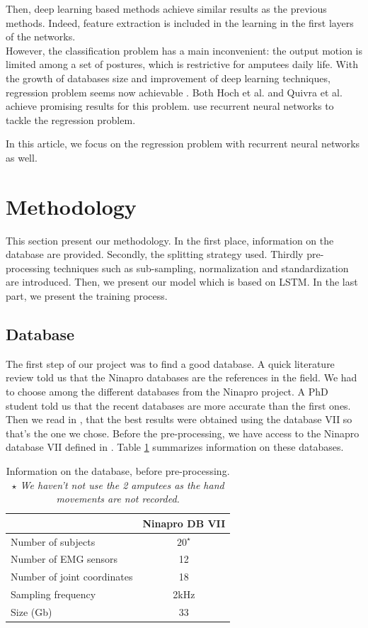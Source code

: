 \documentclass[final]{cvpr}
\begin{document}
Then, deep learning based methods achieve similar results \cite{coteallard2019deep,Ding_2018} as the previous methods. Indeed, feature extraction is included in the learning in the first layers of the networks.\\

However, the classification problem has a main inconvenient: the output motion is limited among a set of postures, which is restrictive for amputees daily life. With the growth of databases size and improvement of deep learning techniques, regression problem seems now achievable \cite{Kir,Koch,Quivira}. Both Hoch et al. and Quivra et al. achieve promising results for this problem. \cite{Kir,Koch,Quivira} use recurrent neural networks to tackle the regression problem.

In this article, we focus on the regression problem with recurrent neural networks as well.

\section{Methodology}
This section present our methodology. In the first place, information on the database are provided. Secondly, the splitting strategy used. Thirdly pre-processing techniques such as sub-sampling, normalization and standardization are introduced. Then, we present our model which is based on LSTM. In the last part, we present the training process.
\subsection{Database}
The first step of our project was to find a good database. A quick literature review told us that the Ninapro databases are the references in the field. We had to choose among the different databases from the Ninapro project. A PhD student told us that the recent databases are more accurate than the first ones. Then we read in \cite{Koch}, that the best results were obtained using the database VII so that's the one we chose.
Before the pre-processing, we have access to the Ninapro database VII defined in \cite{Krasoulis2017}. Table \ref{database_info} summarizes information on these databases.

\begin{table}
	\begin{center}
		\begin{tabular}{l c  }
			\toprule
			 & Ninapro DB VII \\
			\hline
			Number of subjects & $20^\star$   \\
			Number of EMG sensors & 12  \\
			Number of joint coordinates  & 18 \\
			Sampling frequency & 2kHz  \\
			Size (Gb) & 33  \\
			\toprule
		\end{tabular}
	\end{center}
	\caption{Information on the database, before pre-processing.\\
	\emph{$\star$ We haven't not use the 2 amputees as the hand movements are not recorded.}}
	\label{database_info}
\end{table}
\end{document}
